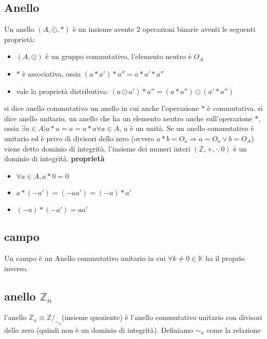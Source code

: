 \documentclass{article}
\begin{document}
    \subsection{Anello}
        Un anello $(A,\odot,\ast)$ è un insieme avente 2 operazioni binarie aventi le seguenti proprietà:
        \begin{itemize}
            \item $(A,\odot)$ è un gruppo commutativo, l'elemento neutro è $O_A$
            \item $\ast$ è associativa, ossia $(a\ast a')\ast a''=a\ast a' \ast a''$
            \item vale la proprietà distributiva: $(a\odot a')\ast a''=(a\ast a'')\odot(a'\ast a'')$
        \end{itemize}
        
        si dice anello commutativo un anello in cui anche l'operazione $\ast$ è commutativa.
        si dice anello unitario, un anello che ha un elemento neutro anche sull'operazione $\ast$, ossia $\exists u \in A | a \ast u = a = u \ast a\forall a\in A$, u è un unità.
        Se un anello commutativo è unitario ed è privo di divisori dello zero (ovvero $a\ast b = O_a \Rightarrow a=O_a\lor b=O_A$) viene detto dominio di integrità, l'insieme dei numeri interi $(\mathbb{Z},+,\cdot,0)$ è un dominio di integrità.
        \textbf{proprietà}

        \begin{itemize}
            \item $\forall a \in A, a\ast 0 = 0$
            \item $a \ast (-a')= (-aa')=(-a)\ast a'$
            \item $(-a)\ast (-a')=aa'$
        \end{itemize}

    \subsection{campo}
        Un campo è un Anello commutativo unitario in cui $\forall k\neq 0\in \mathbb{K}$ ha il proprio inverso.
    
    \subsection{anello $\mathbb{Z}_n$}
        l'anello $\mathbb{Z}_n\equiv \mathbb{Z}/_{\sim_n}$(insieme quoziente) è l'anello commutativo unitario con divisori dello zero (quindi non è un dominio di integrità). Definiamo $\sim_n$ come la relazione 
        
\end{document}
